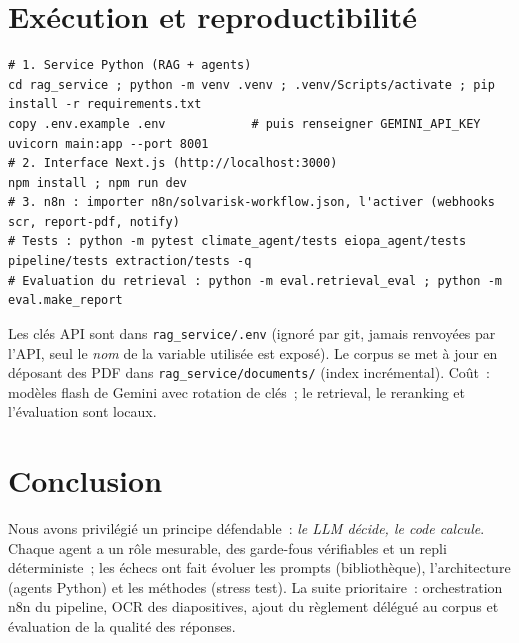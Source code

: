 \documentclass[11pt,a4paper]{article}
\newcommand{\code}[1]{\texttt{\small #1}}
\begin{document}
\section{Ex\'ecution et reproductibilit\'e}
\begin{lstlisting}
# 1. Service Python (RAG + agents)
cd rag_service ; python -m venv .venv ; .venv/Scripts/activate ; pip install -r requirements.txt
copy .env.example .env            # puis renseigner GEMINI_API_KEY
uvicorn main:app --port 8001
# 2. Interface Next.js (http://localhost:3000)
npm install ; npm run dev
# 3. n8n : importer n8n/solvarisk-workflow.json, l'activer (webhooks scr, report-pdf, notify)
# Tests : python -m pytest climate_agent/tests eiopa_agent/tests pipeline/tests extraction/tests -q
# Evaluation du retrieval : python -m eval.retrieval_eval ; python -m eval.make_report
\end{lstlisting}
Les cl\'es API sont dans \code{rag\_service/.env} (ignor\'e par git, jamais renvoy\'ees par l'API, seul le \emph{nom} de la variable utilis\'ee est expos\'e). Le corpus se met \`a jour en d\'eposant des PDF dans \code{rag\_service/documents/} (index incr\'emental). Co\^ut~: mod\`eles \og flash\fg{} de Gemini avec rotation de cl\'es~; le retrieval, le reranking et l'\'evaluation sont locaux.

\section{Conclusion}
Nous avons privil\'egi\'e un principe d\'efendable~: \emph{le LLM d\'ecide, le code calcule}. Chaque agent a un r\^ole mesurable, des garde-fous v\'erifiables et un repli d\'eterministe~; les \'echecs ont fait \'evoluer les prompts (biblioth\`eque), l'architecture (agents Python) et les m\'ethodes (stress test). La suite prioritaire~: orchestration n8n du pipeline, OCR des diapositives, ajout du r\`eglement d\'el\'egu\'e au corpus et \'evaluation de la qualit\'e des r\'eponses.
\end{document}
